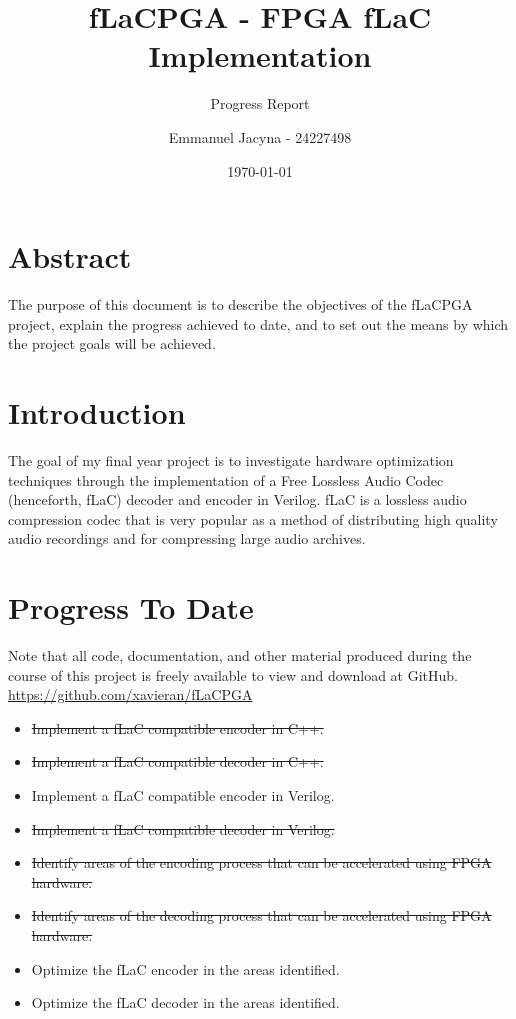 \documentclass[12pt]{scrartcl}
\title{fLaCPGA - FPGA fLaC Implementation}
\subtitle{Progress Report}
\author{Emmanuel Jacyna - 24227498}
\date{\today}
\begin{document}
\pagestyle{myheadings}
  \maketitle
  \tableofcontents
  
  \section*{Abstract}
  The purpose of this document is to describe the objectives of the fLaCPGA project, explain the progress achieved to date, and to set out the means by which the project goals will be achieved.
  \section{Introduction}
  The goal of my final year project is to investigate hardware optimization techniques through the implementation of a Free Lossless Audio Codec (henceforth, fLaC) decoder and encoder in Verilog. fLaC is a lossless audio compression codec that is very popular as a method of distributing high quality audio recordings and for compressing large audio archives\cite{flac_popular}.
  
  \section{Progress To Date}
  Note that all code, documentation, and other material produced during the course of this project is freely available to view and download at GitHub. \url{https://github.com/xavieran/fLaCPGA}
  
  \begin{itemize}
    \item \st{Implement a fLaC compatible encoder in C++.}
    \item \st{Implement a fLaC compatible decoder in C++.}
    \item Implement a fLaC compatible encoder in Verilog.
    \item \st{Implement a fLaC compatible decoder in Verilog.}
    \item \st{Identify areas of the encoding process that can be accelerated using FPGA hardware.}
    \item \st{Identify areas of the decoding process that can be accelerated using FPGA hardware.}
    \item Optimize the fLaC encoder in the areas identified.
    \item Optimize the fLaC decoder in the areas identified.
  \end{itemize}
  
\end{document}
